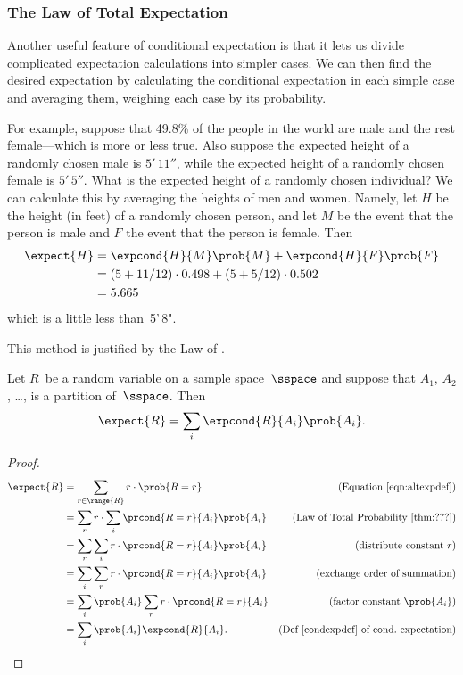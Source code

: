 \subsubsection{The Law of Total Expectation}

Another useful feature of conditional expectation is that it lets us
divide complicated expectation calculations into simpler cases.  We
can then find the desired expectation by calculating the conditional
expectation in each simple case and averaging them, weighing each case
by its probability.

For example, suppose that 49.8\% of the people in the world are male and
the rest female---which is more or less true.  Also suppose the expected
height of a randomly chosen male is $5'\,11''$, while the expected height
of a randomly chosen female is $5'\,5''$.  What is the expected height of a
randomly chosen individual?  We can calculate this by averaging the
heights of men and women.  Namely, let $H$ be the height (in feet) of a
randomly chosen person, and let $M$ be the event that the person is male
and $F$ the event that the person is female.  Then
\begin{align*}
\expect{H} &= \expcond{H}{M} \prob{M} + \expcond{H}{F} \prob{F}\\
&= (5 + 11/12) \cdot 0.498  + (5+ 5/12) \cdot 0.502\\
&= 5.665
\end{align*}
which is a little less than~5'\,8".

This method is justified by the Law of .

\begin{theorem}\label{total_expect}
Let $R$~be a random variable on a sample space~$\sspace$ and suppose
that $A_1$, $A_2$, \dots, is a partition of~$\sspace$.  Then
\begin{equation*}
    \expect{R} = \sum_i \expcond{R}{A_i} \prob{A_i}.
\end{equation*}
\end{theorem}

\begin{proof}
  \begin{align*}
    \expect{R} &= \sum_{r \in \range{R}} r \cdot \prob{R=r}
                  & \text{(Equation~\ref{eqn:altexpdef})}\\
    &= \sum_r r \cdot \sum_i \prcond{R=r}{A_i} \prob{A_i}
            & \text{(Law of Total Probability \ref{thm:???})}\\
    &= \sum_r \sum_i r \cdot \prcond{R=r}{A_i} \prob{A_i}
              & \text{(distribute constant $r$)}\\
    &= \sum_i \sum_r r \cdot \prcond{R=r}{A_i} \prob{A_i}
              & \text{(exchange order of summation)}\\
    &= \sum_i \prob{A_i} \sum_r r \cdot \prcond{R=r}{A_i}
             & \text{(factor constant $\prob{A_i}$)}\\
    &= \sum_i \prob{A_i} \expcond{R}{A_i}.
             & \text{(Def~\ref{condexpdef} of cond.\ expectation)}
  \end{align*}
\end{proof}

